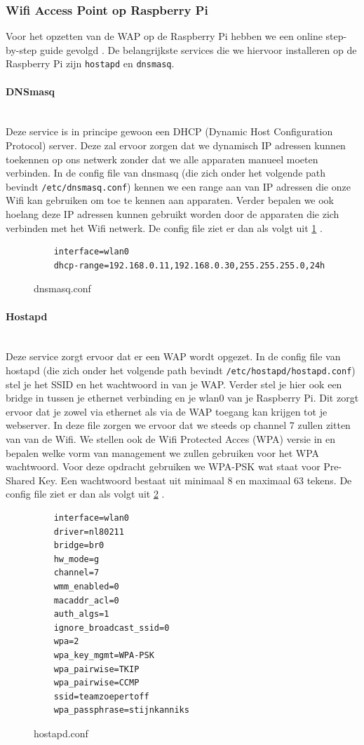 \documentclass[a4paper,kul]{kulakarticle} %
\begin{document}
\subsubsection{Wifi Access Point op Raspberry Pi}
Voor het opzetten van de WAP op de Raspberry Pi hebben we een online step-by-step guide gevolgd \cite{RaspberryPiWAP}. De belangrijkste services die we hiervoor installeren op de Raspberry Pi zijn \verb|hostapd| en \verb|dnsmasq|.
\paragraph{DNSmasq} \mbox{}\\ 
Deze service is in principe gewoon een DHCP (Dynamic Host Configuration Protocol) server. Deze zal ervoor zorgen dat we dynamisch IP adressen kunnen toekennen op ons netwerk zonder dat we alle apparaten manueel moeten verbinden. In de config file van dnsmasq (die zich onder het volgende path bevindt \verb|/etc/dnsmasq.conf|) kennen we een range aan van IP adressen die onze Wifi kan gebruiken om toe te kennen aan apparaten. Verder bepalen we ook hoelang deze IP adressen kunnen gebruikt worden door de apparaten die zich verbinden met het Wifi netwerk. De config file ziet er dan als volgt uit \ref{fig:dnsmasq} .
\begin{figure}[!h]
	\begin{verbatim}
	interface=wlan0
	dhcp-range=192.168.0.11,192.168.0.30,255.255.255.0,24h
	\end{verbatim}
	\caption{dnsmasq.conf}
	\label{fig:dnsmasq}
\end{figure}
\paragraph{Hostapd} \mbox{}\\
Deze service zorgt ervoor dat er een WAP wordt opgezet. In de config file van hostapd (die zich onder het volgende path bevindt \verb|/etc/hostapd/hostapd.conf|) stel je het SSID en het wachtwoord in van je WAP. Verder stel je hier ook een bridge in tussen je ethernet verbinding en je wlan0 van je Raspberry Pi. Dit zorgt ervoor dat je zowel via ethernet als via de WAP toegang kan krijgen tot je webserver. In deze file zorgen we ervoor dat we steeds op channel 7 zullen zitten van van de Wifi. We stellen ook de Wifi Protected Acces (WPA) versie in en bepalen welke vorm van management we zullen gebruiken voor het WPA wachtwoord. Voor deze opdracht gebruiken we WPA-PSK wat staat voor Pre-Shared Key. Een wachtwoord bestaat uit minimaal 8 en maximaal 63 tekens. De config file ziet er dan als volgt uit \ref{fig:hostapd} .
\begin{figure}[!h]
	\begin{verbatim}
	interface=wlan0
	driver=nl80211
	bridge=br0
	hw_mode=g
	channel=7
	wmm_enabled=0
	macaddr_acl=0
	auth_algs=1
	ignore_broadcast_ssid=0
	wpa=2
	wpa_key_mgmt=WPA-PSK
	wpa_pairwise=TKIP
	wpa_pairwise=CCMP
	ssid=teamzoepertoff
	wpa_passphrase=stijnkanniks
	\end{verbatim}
	\caption{hostapd.conf}
	\label{fig:hostapd}
\end{figure}
\newpage
\end{document}
